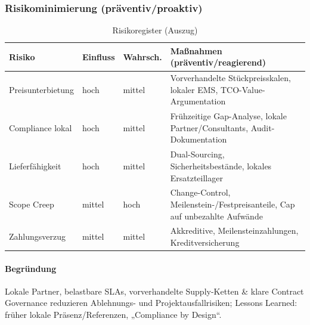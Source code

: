 \documentclass[
%
ngerman %
%
numeric %
]{wbh-assignment}
\begin{document}
\subsubsection{Risikominimierung (präventiv/proaktiv)}
\begin{table}[htb!]
\centering
\caption{Risikoregister (Auszug)}
\begin{tabular}{l l l l}
\textbf{Risiko} & \textbf{Einfluss} & \textbf{Wahrsch.} & \textbf{Maßnahmen (präventiv/reagierend)} \\
\hline
Preisunterbietung & hoch & mittel & Vorverhandelte Stückpreisskalen, lokaler EMS, TCO-Value-Argumentation \\
Compliance lokal & hoch & mittel & Frühzeitige Gap-Analyse, lokale Partner/Consultants, Audit-Dokumentation \\
Lieferfähigkeit & hoch & mittel & Dual-Sourcing, Sicherheitsbestände, lokales Ersatzteillager \\
Scope Creep & mittel & hoch & Change-Control, Meilenstein-/Festpreisanteile, Cap auf unbezahlte Aufwände \\
Zahlungsverzug & mittel & mittel & Akkreditive, Meilensteinzahlungen, Kreditversicherung \\
\end{tabular}
\end{table}

\paragraph{Begründung}
Lokale Partner, belastbare SLAs, vorverhandelte Supply-Ketten \& klare Contract Governance reduzieren Ablehnungs- und Projektausfallrisiken; Lessons Learned: früher lokale Präsenz/Referenzen, „Compliance by Design“.

\clearpage

\cleardoublepage

\appendix
{}
\setcounter{page}{1}

\makeatletter
\renewcommand\chapter{\@startsection{chapter}{0}{\z@}%
	{-3.5ex \@plus -1ex \@minus -.2ex}%
	{2.3ex \@plus.2ex}%
	{\normalfont\Large\bfseries}}
\makeatother

\begingroup
\raggedright
\printbibliography
\endgroup

\nopagebreak
\printnoidxglossary[type=\acronymtype] %

\nopagebreak
\listoffigures %

\nopagebreak
\listoftables %

\nopagebreak
\lstlistoflistings %

\end{document}
